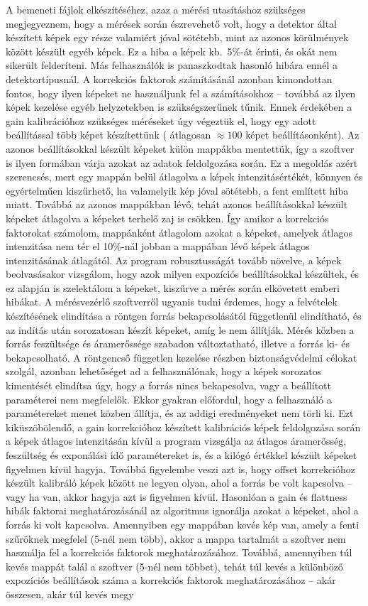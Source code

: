 \documentclass[a4paper,12pt]{article}
\begin{document}
 
A bemeneti fájlok elkészítéséhez, azaz a mérési utasításhoz szükséges megjegyeznem, hogy a mérések során észrevehető volt, hogy a detektor által készített képek egy része valamiért jóval sötétebb, mint az azonos körülmények között készült egyéb képek. Ez a hiba a képek kb.\ 5\%-át érinti, és okát nem sikerült felderíteni. Más felhasználók is panaszkodtak hasonló hibára ennél a detektortípusnál. A korrekciós faktorok számításánál azonban kimondottan fontos, hogy ilyen képeket ne használjunk fel a számításokhoz -- továbbá az ilyen képek kezelése egyéb helyzetekben is szükségszerűnek tűnik. Ennek érdekében a gain kalibrációhoz szükséges méréseket úgy végeztük el, hogy egy adott beállítással több képet készítettünk ( átlagosan $\approx 100$ képet beállításonként). Az azonos beállításokkal készült képeket külön mappákba mentettük, így a szoftver is ilyen formában várja azokat az adatok feldolgozása során. Ez a megoldás azért szerencsés, mert egy mappán belül átlagolva a képek intenzitásértékét, könnyen és egyértelműen kiszűrhető, ha valamelyik kép jóval sötétebb, a fent említett hiba miatt. Továbbá az azonos mappákban lévő, tehát azonos beállításokkal készült képeket átlagolva a képeket terhelő zaj is csökken. Így amikor a korrekciós faktorokat számolom, mappánként átlagolom azokat a képeket, amelyek átlagos intenzitása nem tér el 10\%-nál jobban a mappában lévő képek átlagos intenzitásának átlagától. Az program  robusztusságát  tovább növelve, a képek beolvasásakor vizsgálom, hogy  azok milyen expozíciós beállításokkal készültek, és ez alapján is szelektálom a képeket, kiszűrve a mérés során elkövetett emberi hibákat. A mérésvezérlő szoftverről ugyanis tudni érdemes, hogy a felvételek készítésének elindítása a röntgen forrás bekapcsolásától függetlenül elindítható, és az indítás után sorozatosan készít képeket, amíg le nem állítják. Mérés közben a forrás feszültsége és áramerőssége szabadon változtatható, illetve a forrás ki- és bekapcsolható. A röntgencső független kezelése részben biztonságvédelmi célokat szolgál, azonban lehetőséget ad a felhasználónak, hogy a képek sorozatos kimentését elindítsa úgy, hogy a forrás nincs bekapcsolva, vagy a beállított paraméterei nem megfelelők. Ekkor gyakran előfordul, hogy a felhasználó a paramétereket menet közben állítja, és az addigi eredményeket nem törli ki. Ezt kiküszöbölendő, a gain korrekcióhoz készített kalibrációs képek feldolgozása során a képek átlagos intenzitásán kívül a program vizsgálja az átlagos áramerősség, feszültség és exponálási idő paramétereket is, és a kilógó értékkel készült képeket figyelmen kívül hagyja. Továbbá figyelembe veszi azt is, hogy offset korrekcióhoz készült kalibráló képek között ne legyen olyan, ahol a forrás be volt kapcsolva -- vagy ha van, akkor hagyja azt is figyelmen kívül. Hasonlóan a gain és flattness hibák faktorai meghatározásánál az algoritmus ignorálja azokat a képeket, ahol a forrás ki volt kapcsolva. Amennyiben egy mappában kevés kép van, amely a fenti szűröknek megfelel (5-nél nem több), akkor a mappa tartalmát a szoftver nem használja fel a korrekciós faktorok meghatározásához. Továbbá, amennyiben túl kevés mappát talál a szoftver (5-nél nem többet), tehát túl kevés a különböző expozíciós beállítások száma a korrekciós faktorok meghatározásához -- akár összesen, akár túl kevés megy 
\end{document}
